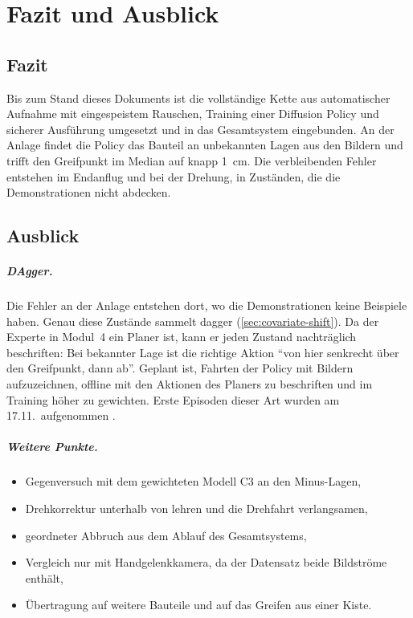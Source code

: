 \chapter{Fazit und Ausblick}
\label{ch:fazit}

\section{Fazit}
\label{sec:fazit}


Bis zum Stand dieses Dokuments ist die vollständige Kette aus automatischer Aufnahme mit
eingespeistem Rauschen, Training einer Diffusion Policy und sicherer Ausführung umgesetzt und
in das Gesamtsystem eingebunden. An der Anlage findet die Policy das Bauteil an unbekannten
Lagen aus den Bildern und trifft den Greifpunkt im Median auf knapp \SI{1}{\centi\metre}.
Die verbleibenden Fehler entstehen im Endanflug und bei der Drehung, in Zuständen, die die
Demonstrationen nicht abdecken.

\section{Ausblick}
\label{sec:ausblick}

\paragraph{DAgger.} Die Fehler an der Anlage entstehen dort, wo die Demonstrationen keine
Beispiele haben. Genau diese Zustände sammelt \ac{dagger} (\cref{sec:covariate-shift}). Da der
Experte in Modul~4 ein Planer ist, kann er jeden Zustand nachträglich beschriften: Bei
bekannter Lage ist die richtige Aktion \enquote{von hier senkrecht über den Greifpunkt, dann
ab}. Geplant ist, Fahrten der Policy mit Bildern aufzuzeichnen, offline mit den Aktionen des
Planers zu beschriften und im Training höher zu gewichten. Erste Episoden dieser Art wurden am
17.11.\ aufgenommen .

\paragraph{Weitere Punkte.}
\begin{itemize}
  \item Gegenversuch mit dem gewichteten Modell C3 an den Minus-Lagen,
  \item Drehkorrektur unterhalb von  lehren und die Drehfahrt verlangsamen,
  \item geordneter Abbruch aus dem Ablauf des Gesamtsystems,
  \item Vergleich nur mit Handgelenkkamera, da der Datensatz beide Bildströme enthält,
  \item Übertragung auf weitere Bauteile und auf das Greifen aus einer Kiste.
\end{itemize}
